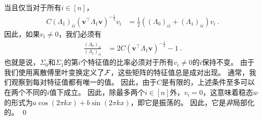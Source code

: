 当且仅当对于所有$i \in [n]$，
\begin{align*}
  C (\Lambda_1)_{ii} (\mathbf{v}^\top \Lambda_1 \mathbf{v})^{-\frac{1}{2}} v_i &= \frac{1}{2} ( (\Lambda_0)_{ii} + (\Lambda_1)_{ii} ) v_i~.
\end{align*}
因此，如果$v_i \neq 0$，我们必须有
\begin{align*}
  \frac{(\Lambda_0)_{ii}}{(\Lambda_1)_{ii}} &= 2 C (\mathbf{v}^\top \Lambda_1 \mathbf{v})^{-\frac{1}{2}} - 1~.
\end{align*}
也就是说，$\Sigma_0$和$\Sigma_1$的第$i$个特征值的比率必须对于所有$v_i \neq 0$的$i$保持不变。
由于我们使用离散傅里叶变换定义了$\operatorname{\mathcal{F}}$，这些矩阵的特征值总是成对出现。
通常，我们观察到每对特征值都有唯一的值。
因此，由于$C$是有限的，上述条件至多可以在两个不同的$i$值下成立。
因此，除最多两个$i \in [n]$外，$v_i = 0$，这意味着稳态$w$的形式为$a \cos(2\pi k x) + b \sin(2 \pi k x)$，即它是振荡的。
因此，它是\emph{非}局部化的。
\qed
